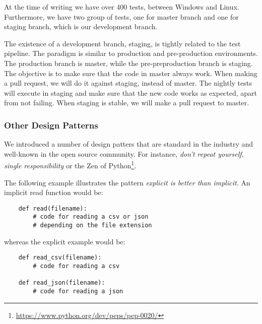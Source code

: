 At the time of writing we have over 400 tests, between Windows and Linux. Furthermore, we have two group of tests,
one for master branch and one for staging branch, which is our development branch.

The existence of a development branch, staging, is tightly related to the test pipeline. The paradigm is similar to
production and pre-production environments. The production branch is master, while the pre-preproduction branch is staging.
The objective is to make sure that the code in master always work. When making a pull request, we will
do it against staging, instead of master. The nightly tests will execute in staging and make sure that the new code 
works as expected, apart from not failing. When staging is stable, we will make a pull request to master.  


\subsubsection{Other Design Patterns}

We introduced a number of design patters that are standard in the industry and well-known
in the open source community. For instance, \textit{don't repeat yourself}, \textit{single
responsibility} or the Zen of Python\footnote{\url{https://www.python.org/dev/peps/pep-0020/}}. 

The following example illustrates the pattern \textit{explicit is better than implicit}.
An implicit read function would be: 
\begin{verbatim}
    def read(filename):
        # code for reading a csv or json
        # depending on the file extension
\end{verbatim}

whereas the explicit example would be:
\begin{verbatim}
    def read_csv(filename):
        # code for reading a csv

    def read_json(filename):
        # code for reading a json
\end{verbatim}



